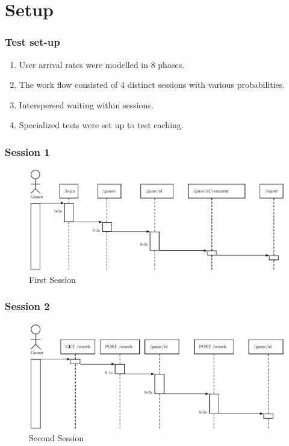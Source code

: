 \section{Setup}
\begin{frame}
\frametitle{Test set-up}

\begin{enumerate}[<+->]
	\setlength\itemsep{1em}
	\item User arrival rates were modelled in 8 phases.
	\item The work flow consisted of 4 distinct sessions with various probabilities.
	\item Interspersed waiting within sessions.
	\item Specialized tests were set up to test caching.  
\end{enumerate}
\end{frame}

\begin{frame}
\frametitle{Session 1}
\begin{figure}[h]
	\centering
	\includegraphics[width=1\textwidth, height=0.5\textheight]{images/generic-1.pdf}
	\caption{First Session}\label{fig:sqlopt}
\end{figure}
\end{frame}

\begin{frame}
\frametitle{Session 2}
\begin{figure}[h]
	\centering
	\includegraphics[width=1\textwidth, height=0.5\textheight]{images/generic-2.pdf}
	\caption{Second Session}\label{fig:sqlopt}
\end{figure}
\end{frame}


